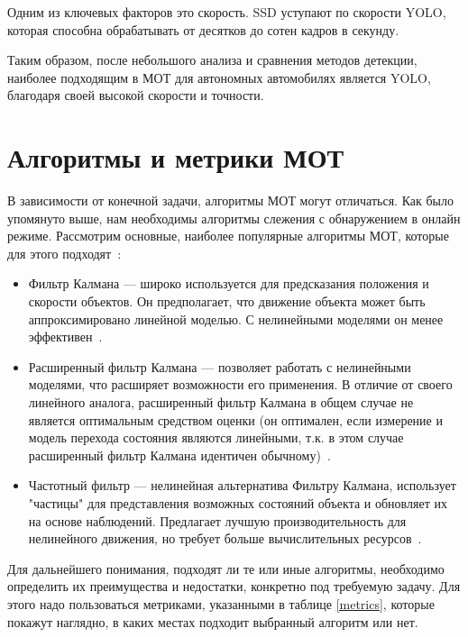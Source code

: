 
Одним из ключевых факторов это скорость. SSD уступают по скорости YOLO, которая способна обрабатывать от десятков до сотен кадров в секунду. 

Таким образом, после небольшого анализа и сравнения методов детекции, наиболее подходящим  в МОТ для автономных автомобилях является YOLO, благодаря своей высокой скорости и точности.



\section{Алгоритмы и метрики МОТ}
В зависимости от конечной задачи, алгоритмы МОТ могут отличаться. Как было упомянуто выше, нам  необходимы алгоритмы слежения с обнаружением в онлайн режиме. Рассмотрим основные, наиболее популярные алгоритмы МОТ, которые для этого подходят~\cite{Article::Luo2021}:

\begin{itemize}
	
	\item Фильтр Калмана --- широко используется для предсказания положения и скорости объектов. Он предполагает, что движение объекта может быть аппроксимировано линейной моделью. С нелинейными моделями он менее эффективен~\cite{Rodriguez2011}.
	
	\item Расширенный фильтр Калмана --- позволяет работать с нелинейными моделями, что расширяет возможности его применения. В отличие от своего линейного аналога, расширенный фильтр Калмана в общем случае не является оптимальным средством оценки (он оптимален, если измерение и модель перехода состояния являются линейными, т.к. в этом случае расширенный фильтр Калмана идентичен обычному)~\cite{Mitzel2011, ExtendetKalmanFilter2023}. 
	
	\item Частотный фильтр --- нелинейная альтернатива Фильтру Калмана, использует "частицы" для представления возможных состояний объекта и обновляет их на основе наблюдений. Предлагает лучшую производительность для нелинейного движения, но требует больше вычислительных ресурсов~\cite{Yang2009}.

	
\end{itemize}

Для дальнейшего понимания, подходят ли те или иные алгоритмы, необходимо определить их преимущества и недостатки, конкретно под требуемую задачу. Для этого надо пользоваться метриками, указанными в таблице \ref{metrics}, которые покажут наглядно, в каких местах подходит выбранный алгоритм или нет.

